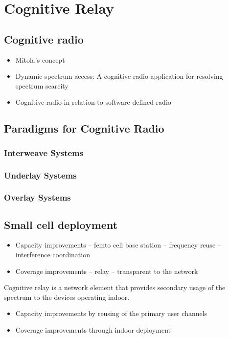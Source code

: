 \chapter{Cognitive Relay}
\label{chap:wav}

\section{Cognitive radio}
\begin{itemize}
\item Mitola's concept
\item Dynamic spectrum access: A cognitive radio application for resolving spectrum scarcity
\item Cognitive radio in relation to software defined radio
\end{itemize}

\section{Paradigms for Cognitive Radio}
\subsection{Interweave Systems}
\subsection{Underlay Systems}
\subsection{Overlay Systems}

\section{Small cell deployment}
\begin{itemize}
\item Capacity improvements -- femto cell base station -- frequency reuse -- interference coordination 
\item Coverage improvements -- relay -- transparent to the network
\end{itemize}

Cognitive relay is a network element that provides secondary usage of the spectrum to the devices operating indoor.
\begin{itemize}
\item Capacity improvements by reusing of the primary user channels 
\item Coverage improvements through indoor deployment
\end{itemize}


